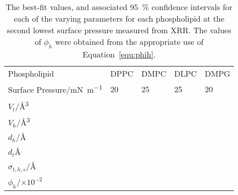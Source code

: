 %
%
\begin{table}
    \centering
    \small
    \caption{The best-fit values, and associated \SI{95}{\percent} confidence intervals for each of the varying parameters for each phospholipid at the second lowest surface pressure measured from XRR. The values of $\phi_h$ were obtained from the appropriate use of Equation~\ref{equ:phih}.}
    \label{tab:xrrref2}
    \begin{tabular}{l | l l l l}
        \toprule
        Phospholipid & DPPC & DMPC & DLPC & DMPG \\
        Surface Pressure/\si{\milli\newton\per\meter} & 20 & 25 & 25 & 20 \\
        \midrule
        $V_t$/\si{\angstrom\cubed} &  &  &  &  \\
        $V_h$/\si{\angstrom\cubed} &  &  &  &  \\
        $d_h$/\si{\angstrom} &  &  &  &  \\
        \midrule
        $d_t$\si{\angstrom} &  &  &  &  \\
        $\sigma_{t,h,s}$/\si{\angstrom} &  &  &  &  \\
        \midrule
        $\phi_h$/$\times 10^{-2}$ &  &  &  &  \\
        \bottomrule
    \end{tabular}
\end{table}
